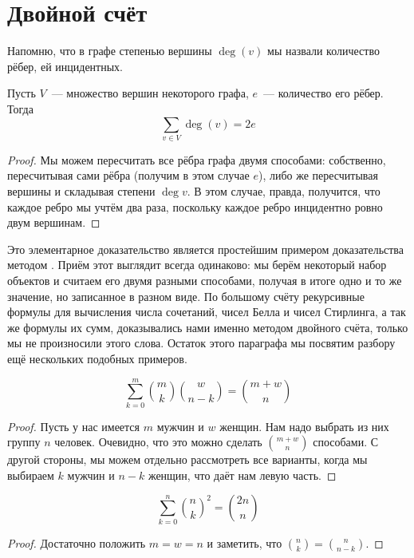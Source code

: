 \section{Двойной счёт}

Напомню, что в графе степенью вершины $\deg(v)$ мы назвали количество рёбер, ей инцидентных.

\begin{thm}
Пусть $V$~— множество вершин некоторого графа, $e$~— количество его рёбер. Тогда
$$\sum_{v\in V}\deg(v) = 2e$$
\end{thm}
\begin{proof}
Мы можем пересчитать все рёбра графа двумя способами: собственно, пересчитывая сами рёбра (получим в этом случае $e$), либо же пересчитывая вершины и складывая степени $\deg{v}$. В этом случае, правда, получится, что каждое ребро мы учтём два раза, поскольку каждое ребро инцидентно ровно двум вершинам.
\end{proof}

Это элементарное доказательство является простейшим примером доказательства методом . Приём этот выглядит всегда одинаково: мы берём некоторый набор объектов и считаем его двумя разными способами, получая в итоге одно и то же значение, но записанное в разном виде. По большому счёту рекурсивные формулы для вычисления числа сочетаний, чисел Белла и чисел Стирлинга, а так же формулы их сумм, доказывались нами именно методом двойного счёта, только мы не произносили этого слова. Остаток этого параграфа мы посвятим разбору ещё нескольких подобных примеров.

\begin{thm}
$$\sum_{k=0}^m {m\choose k}{w\choose n-k} = {m+w\choose n}$$
\end{thm}
\begin{proof}
Пусть у нас имеется $m$ мужчин и $w$ женщин. Нам надо выбрать из них группу $n$ человек. Очевидно, что это можно сделать $m+w\choose n$ способами. С другой стороны, мы можем отдельно рассмотреть все варианты, когда мы выбираем $k$ мужчин и $n-k$ женщин, что даёт нам левую часть.
\end{proof}

\begin{corollary}
$$\sum_{k=0}^n{n\choose k}^2 = {2n\choose n}$$
\end{corollary}
\begin{proof}
Достаточно положить $m=w=n$ и заметить, что ${n\choose k}={n\choose n-k}$.
\end{proof}

